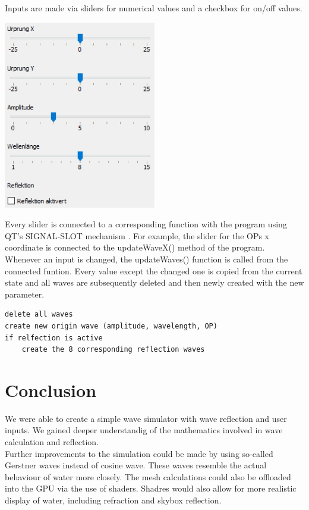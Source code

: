 \documentclass[12pt,a4paper]{scrartcl}
\begin{document}
Inputs are made via sliders for numerical values and a checkbox for on/off values.
\begin{center}
	\includegraphics[width=0.5\textwidth]{Images/Inputs.jpg}
\end{center}

Every slider is connected to a corresponding function with the program using QT's SIGNAL-SLOT mechanism \parencite[compare to][]{slidersExample}. For example, the slider for the OPs x coordinate is connected to the updateWaveX() method of the program.\\
Whenever an input is changed, the updateWaves() function is called from the connected funtion. Every value except the changed one is copied from the current state and all waves are subsequently deleted and then newly created with the new parameter.

\begin{lstlisting}[language=PSEUDO]
delete all waves
create new origin wave (amplitude, wavelength, OP)
if relfection is active
	create the 8 corresponding reflection waves
\end{lstlisting}

\section{Conclusion}
We were able to create a simple wave simulator with wave reflection and user inputs. We gained deeper understandig of the mathematics involved in wave calculation and reflection.\\
Further improvements to the simulation could be made by using so-called Gerstner waves instead of cosine wave. These waves resemble the actual behaviour of water more closely. The mesh calculations could also be offloaded into the GPU via the use of shaders. Shadres would also allow for more realistic display of water, including refraction and skybox reflection.\\
\end{document}
